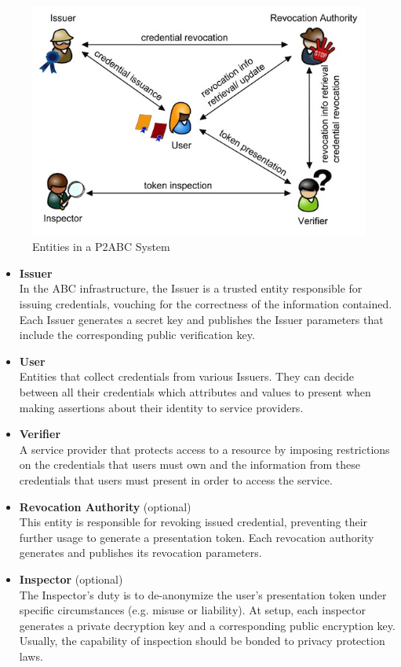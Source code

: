 \begin{figure}[bth]
	\begin{center}
		\includegraphics[width=\linewidth]{gfx/actors}
	\end{center}
	\caption{Entities in a P2ABC System}
	\label{fig:actors}
\end{figure}

\begin{itemize}
	\item \textbf{Issuer}\\
	In the ABC infrastructure, the Issuer is a trusted entity responsible for issuing credentials, vouching for the correctness of the information contained. Each Issuer generates a secret key and publishes the Issuer parameters that include the corresponding public verification key.
	
	\item \textbf{User}\\
	Entities that collect credentials from various Issuers. They can decide between all their credentials which attributes and values to present when making assertions about their identity to service providers.
	
	\item \textbf{Verifier}\\
	A service provider that protects access to a resource by imposing restrictions on the credentials that users must own and the information from these credentials that users must present in order to access the service.
	
	\item \textbf{Revocation Authority} (optional)\\
	This entity is responsible for revoking issued credential, preventing their further usage to generate a presentation token. Each revocation authority generates and publishes its revocation parameters.
	
	\item \textbf{Inspector} (optional)\\
	The Inspector's duty is to de-anonymize the user's presentation token under specific circumstances (e.g. misuse or liability). At setup, each inspector generates a private decryption key and a corresponding public encryption key. Usually, the capability of inspection should be bonded to privacy protection laws.
	
\end{itemize}

